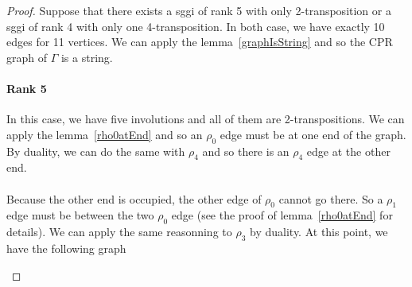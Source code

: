 \begin{proof}
  Suppose that there exists a sggi of rank 5 with only 2-transposition or a sggi of rank 4 with only one 4-transposition. In both case, we have exactly 10 edges for 11 vertices. We can apply the lemma~\ref{graphIsString} and so the CPR graph of $\Gamma$ is a string.

  \paragraph{Rank 5}
  In this case, we have five involutions and all of them are 2-transpositions. We can apply the lemma~\ref{rho0atEnd} and so an $\rho_0$ edge must be at one end of the graph. By duality, we can do the same with $\rho_4$ and so there is an $\rho_4$ edge at the other end.

  \paragraph{}
  Because the other end is occupied, the other edge of $\rho_0$ cannot go there. So a $\rho_1$ edge must be between the two $\rho_0$ edge (see the proof of lemma~\ref{rho0atEnd} for details). We can apply the same reasonning to $\rho_3$ by duality. At this point, we have the following graph

  \begin{figure}[H]
    \begin{center}
\end{center}
\end{figure}
\end{proof}
